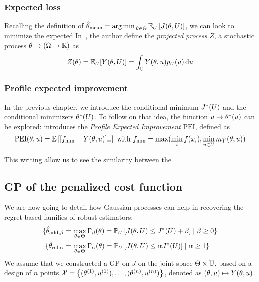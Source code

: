 \documentclass[../../Main_ManuscritThese.tex]{subfiles}
\begin{document}
\subsubsection{Expected loss}
Recalling the definition of $\hat{\theta}_{\mathrm{mean}} = \operatorname*{arg\,min \,}_{\theta \in \Theta} \mathbb{E}_{U}\left[J(\theta, U)\right]$, we can look to minimize the expected 
In~\cite{janusevskis_simultaneous_2010}, the author define the \emph{projected process} $Z$, a stochastic process $\theta \rightarrow \left(\Omega \rightarrow \mathbb{R}\right)$ as
\begin{equation}
  Z(\theta) = \mathbb{E}_U[Y(\theta, U)] = \int_{\mathbb{U}} Y(\theta, u) p_{U}(u)\,\mathrm{d}u
\end{equation}


\subsubsection{Profile expected improvement}
In the previous chapter, we introduce the conditional minimum $J^*(U)$ and the conditional minimizers $\theta^*(U)$. To follow on that idea, the function $u \mapsto \theta^*(u)$ can be explored: \cite{ginsbourger_bayesian_2014} introduces the \emph{Profile Expected Improvement} $\mathrm{PEI}$, defined as
\begin{equation}
  \label{eq:def_PEI}
  \mathrm{PEI}(\theta, u)= \mathbb{E}\left[[f_{\min} - Y(\theta, u)]_+\right] \text{ with } f_{\min} = \max(\min_i f(x_i), \min_{u \in U} m_Y(\theta, u))
\end{equation}

This writing allow us to see the similarity between the 


\subsection{GP of the penalized cost function}
\label{ssec:gp_delta_alpha}

We are now going to detail how Gaussian processes can help in recovering the regret-based families of robust estimators:
\begin{align}
  \{ \hat{\theta}_{\mathrm{add,\beta}} &= \max_{\theta\in\Theta} \Gamma_\beta(\theta) = \mathbb{P}_{U}\left[J(\theta, U) \leq J^*(U) + \beta \right] \mid \beta \geq 0 \} \\
\{ \hat{\theta}_{\mathrm{rel,\alpha}} &= \max_{\theta\in\Theta} \Gamma_\alpha(\theta) = \mathbb{P}_{U}\left[J(\theta, U) \leq \alpha J^*(U)\right] \mid \alpha \geq 1 \}
\end{align}
We assume that we constructed a GP on $J$ on the joint space $\Theta \times \mathbb{U}$, based on a design of $n$ points $\mathcal{X} = \left\{(\theta^{(1)},u^{(1)}),\dots,(\theta^{(n)},u^{(n)}) \right\}$, denoted as $(\theta,u)\mapsto Y(\theta,u)$.
\end{document}
